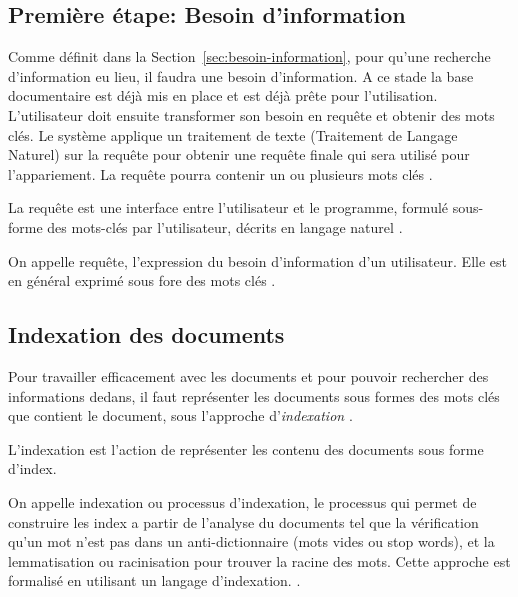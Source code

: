 \subsection{Première étape: Besoin d'information}
Comme définit dans la Section~\ref{sec:besoin-information}, pour qu'une recherche d'information eu lieu, il faudra une besoin d'information. A ce stade la base documentaire est déjà mis en place et est déjà prête pour l'utilisation. L'utilisateur doit ensuite transformer son besoin en requête et obtenir des mots clés. Le système applique un traitement de texte (Traitement de Langage Naturel) sur la requête pour obtenir une requête finale qui sera utilisé pour l'appariement. La requête pourra contenir un ou plusieurs mots clés \citep{modern-ir}.

\begin{definition}
    La requête est une interface entre l'utilisateur et le programme, formulé sous-forme des mots-clés par l'utilisateur, décrits en langage naturel \citep{amelioration-ri-approche-semantique}.
\end{definition}

\begin{definition}
    On appelle requête, l'expression du besoin d'information d'un utilisateur. Elle est en général exprimé sous fore des mots clés \citep{salton1989automatique}.
\end{definition}

\subsection{Indexation des documents}
Pour travailler efficacement avec les documents et pour pouvoir rechercher des informations dedans, il faut représenter les documents sous formes des mots clés que contient le document, sous l'approche d'\emph{indexation} \citep{ir-on-web}.

\begin{definition}
    L'indexation est l'action de représenter les contenu des documents sous forme d'index.
\end{definition}

\begin{definition}
    On appelle indexation ou processus d'indexation, le processus qui permet de construire les index a partir de l'analyse du documents tel que la vérification qu'un mot n'est pas dans un anti-dictionnaire (mots vides ou stop words), et la lemmatisation ou racinisation pour trouver la racine des mots. Cette approche est formalisé en utilisant un langage d'indexation. \citep{paradis:tel-00005009}.
\end{definition}

